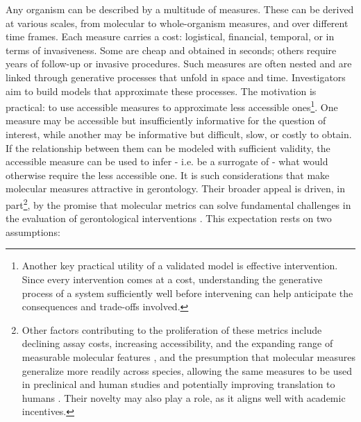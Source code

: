 \documentclass[twocolumn]{article} %
\begin{document}
Any organism can be described by a multitude of measures. These can be derived at various scales, from molecular to whole-organism measures, and over different time frames. Each measure carries a cost: logistical, financial, temporal, or in terms of invasiveness. Some are cheap and obtained in seconds; others require years of follow-up or invasive procedures. Such measures are often nested and are linked through generative processes that unfold in space and time. Investigators aim to build models that approximate these processes. The motivation is practical: to use accessible measures to approximate less accessible ones\footnote{Another key practical utility of a validated model is effective intervention. Since every intervention comes at a cost, understanding the generative process of a system sufficiently well before intervening can help anticipate the consequences and trade-offs involved.}. One measure may be accessible but insufficiently informative for the question of interest, while another may be informative but difficult, slow, or costly to obtain. If the relationship between them can be modeled with sufficient validity, the accessible measure can be used to infer - i.e. be a surrogate of - what would otherwise require the less accessible one. It is such considerations that make molecular measures attractive in gerontology. Their broader appeal is driven, in part\footnote{Other factors contributing to the proliferation of these metrics include declining assay costs, increasing accessibility, and the expanding range of measurable molecular features \citep[a]{kriukov2025we}, and the presumption that molecular measures generalize more readily across species, allowing the same measures to be used in preclinical and human studies and potentially improving translation to humans \citep[e]{moqri2023biomarkers}. Their novelty may also play a role, as it aligns well with academic incentives.}, by the promise that molecular metrics can solve fundamental challenges in the evaluation of gerontological interventions \citep[b]{srour2025deep}\cite[a]{justice2020putting}. This expectation rests on two assumptions:
\end{document}
